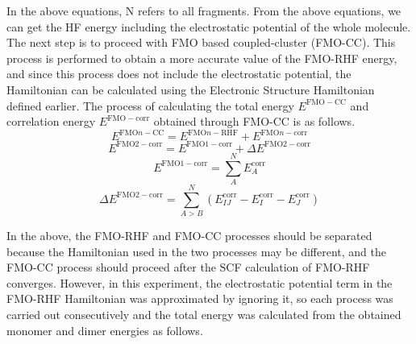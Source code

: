 \documentclass[pdflatex,sn-mathphys-num]{sn-jnl}%
\theoremstyle{thmstyleone}%
\theoremstyle{thmstyletwo}%
\theoremstyle{thmstylethree}%
\begin{document}
In the above equations, N refers to all fragments. From the above equations, we can get the HF energy including the electrostatic potential of the whole molecule. The next step is to proceed with FMO based coupled-cluster (FMO-CC). This process is performed to obtain a more accurate value of the FMO-RHF energy, and since this process does not include the electrostatic potential, the Hamiltonian can be calculated using the Electronic Structure Hamiltonian defined earlier. The process of calculating the total energy \(E^\mathrm{FMO-CC}\) and correlation energy \(E^\mathrm{FMO-corr}\) obtained through FMO-CC is as follows.
\begin{equation}
E^{\mathrm{FMO}n\!-\!\mathrm{CC}} = E^{\mathrm{FMO}n\!-\!\mathrm{RHF}} + E^{\mathrm{FMO}n\!-\!\mathrm{corr}}
\end{equation}
\begin{equation}
E^{\mathrm{FMO2\!-\!corr}} = E^{\mathrm{FMO1\!-\!corr}} + \Delta E^{\mathrm{FMO2\!-\!corr}}
\end{equation}
\begin{equation}
E^{\mathrm{FMO1\!-\!corr}} = \sum_{A}^{N} E_A^{\mathrm{corr}}
\end{equation}
\begin{equation}
\Delta E^{\mathrm{FMO2\!-\!corr}} = \sum_{A>B}^{N} 
\left( E_{IJ}^{\mathrm{corr}} - E_I^{\mathrm{corr}} - E_J^{\mathrm{corr}} \right)
\end{equation}

In the above, the FMO-RHF and FMO-CC processes should be separated because the Hamiltonian used in the two processes may be different, and the FMO-CC process should proceed after the SCF calculation of FMO-RHF converges. However, in this experiment, the electrostatic potential term in the FMO-RHF Hamiltonian was approximated by ignoring it, so each process was carried out consecutively and the total energy was calculated from the obtained monomer and dimer energies as follows.
\end{document}
